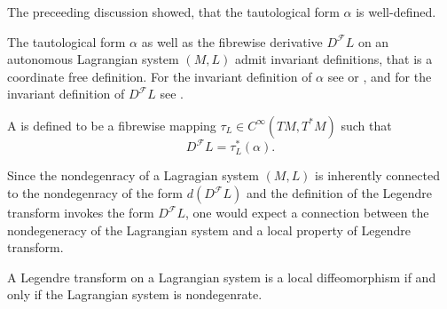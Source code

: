 \begin{remark}
	The preceeding discussion showed, that the tautological form $\alpha$ is well-defined.
\end{remark}

\begin{remark}
	The tautological form $\alpha$ as well as the fibrewise derivative $D^\mathcal{F}L$ on an autonomous Lagrangian system $(M,L)$ admit invariant definitions, that is a coordinate free definition. For the invariant definition of $\alpha$ see \cite[569]{lee:smooth_manifolds:2013} or \cite[10--11]{silva:SG:2008}, and for the invariant definition of $D^\mathcal{F}L$ see \cite[31]{takhtajan:QM:2008}. 
\end{remark}

\begin{definition}
	A  is defined to be a fibrewise mapping $\tau_L \in C^\infty(TM,T^*M)$ such that
	\begin{equation*}
		D^\mathcal{F}L = \tau_L^*(\alpha).
	\end{equation*}
\end{definition}

Since the nondegenracy of a Lagragian system $(M,L)$ is inherently connected to the nondegenracy of the form $d(D^\mathcal{F}L)$ and the definition of the Legendre transform invokes the form $D^\mathcal{F}L$, one would expect a connection between the nondegeneracy of the Lagrangian system and a local property of Legendre transform.

\begin{lemma}
	\label{lem:local_diffeomorphism}
	A Legendre transform on a Lagrangian system is a local diffeomorphism if and only if the Lagrangian system is nondegenrate.	
\end{lemma}


